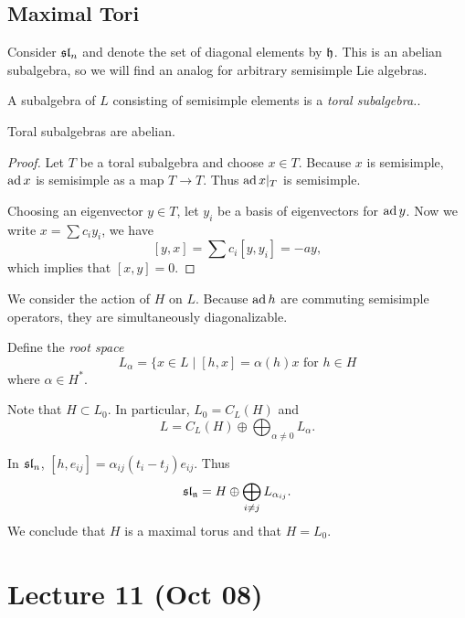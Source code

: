 \documentclass[twoside, 10pt]{article}
\begin{document}
    \subsection{Maximal Tori}%
    
    Consider $\mathfrak{sl}_n$ and denote the set of diagonal elements by $\mathfrak{h}$.
    This is an abelian subalgebra, so we will find an analog for arbitrary
    semisimple Lie algebras.

    \begin{defn} A subalgebra of $L$ consisting of semisimple elements is a
    \textit{toral subalgebra.}.  \end{defn}

    \begin{thm} Toral subalgebras are abelian.  \end{thm}

    \begin{proof} Let $T$ be a toral subalgebra and choose $x \in T$. Because
        $x$ is semisimple, $\operatorname{ad} x$ is semisimple as a map $T \to T$. Thus $\operatorname{ad}
        x|_T$ is semisimple. 

        Choosing an eigenvector $y \in T$, let $y_i$ be a basis of eigenvectors
        for $\operatorname{ad} y$. Now we write $x = \sum c_iy_i$, we have \[ [y,x] = \sum
        c_i [y,y_i] = -ay,\] which implies that $[x,y] = 0$.  \end{proof}

    We consider the action of $H$ on $L$. Because $\operatorname{ad} h$ are commuting
    semisimple operators, they are simultaneously diagonalizable.

    \begin{defn} Define the \textit{root space} \[ L_{\alpha} = \{x \in L \mid
        [h,x] = \alpha(h) x \text{ for $h \in H$}\] where $\alpha \in H^*$.
    \end{defn}

    Note that $H \subset L_0$. In particular, $L_0 = C_L(H)$ and \[ L = C_L(H)
    \oplus \bigoplus_{\alpha \neq 0} L_{\alpha}.\]

    \begin{exm} In $\mathfrak{sl}_n$, $[h,e_{ij}] = \alpha_{ij}(t_i-t_j)e_{ij}$. Thus
        \[ \mathfrak{sl_n} = H \oplus \bigoplus_{i \neq j} L_{\alpha_{ij}}.\] We
    conclude that $H$ is a maximal torus and that $H = L_0$.  \end{exm}

    \section{Lecture 11 (Oct 08)}%
\end{document}

